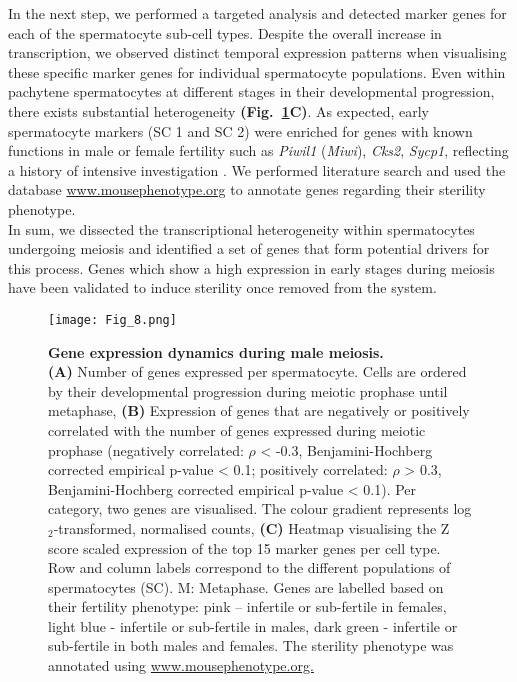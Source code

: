In the next step, we performed a targeted analysis and detected marker genes for each of the spermatocyte sub-cell types. 
Despite the overall increase in transcription, we observed distinct temporal expression patterns when visualising these specific marker genes for individual spermatocyte populations. 
Even within pachytene spermatocytes at different stages in their developmental progression, there exists substantial heterogeneity \textbf{(Fig.~\ref{fig3:meiosis}C)}. 
As expected, early spermatocyte markers (SC 1 and SC 2) were enriched for genes with known functions in male or female fertility such as \textit{Piwil1} (\textit{Miwi}), \textit{Cks2}, \textit{Sycp1}, reflecting a history of intensive investigation \citep{Deng2002, Spruck2003, Vries2005}. 
We performed literature search and used the database \url{www.mousephenotype.org} to annotate genes regarding their sterility phenotype. \\

In sum, we dissected the transcriptional heterogeneity within spermatocytes undergoing meiosis and identified a set of genes that form potential drivers for this process. 
Genes which show a high expression in early stages during meiosis have been validated to induce sterility once removed from the system.  

\newpage

\begin{figure}[!h]
\centering
\texttt{[image: Fig\_8.png]}
\caption[Gene expression dynamics during male meiosis]{\textbf{Gene expression dynamics during male meiosis.} \\
\textbf{(A)} Number of genes expressed per spermatocyte. Cells are ordered by their developmental progression during meiotic prophase until metaphase, 
\textbf{(B)} Expression of genes that are negatively or positively correlated with the number of genes expressed during meiotic prophase 
(negatively correlated: $\rho$ < -0.3, Benjamini-Hochberg corrected empirical p-value < 0.1; positively correlated: $\rho$ > 0.3, Benjamini-Hochberg corrected empirical p-value < 0.1). Per category, two genes are visualised. 
The colour gradient represents log$_2$-transformed, normalised counts, 
\textbf{(C)} Heatmap visualising the Z score scaled expression of the top 15 marker genes per cell type. 
Row and column labels correspond to the different populations of spermatocytes (SC). 
M: Metaphase. Genes are labelled based on their fertility phenotype: pink – infertile or sub-fertile in females, light blue - infertile or sub-fertile in males, dark green - infertile or sub-fertile in both males and females. The sterility phenotype was annotated using \url{www.mousephenotype.org.}}
\label{fig3:meiosis}
\end{figure}

